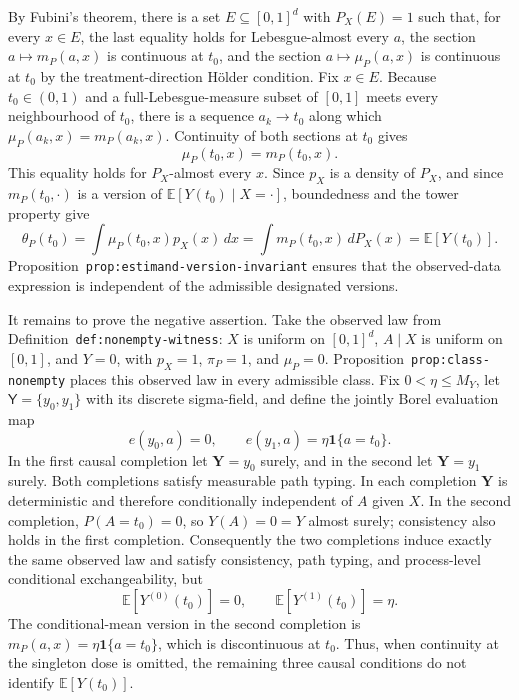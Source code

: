 By Fubini's theorem, there is a set \(E\subseteq[0,1]^d\) with \(P_X(E)=1\) such that, for every \(x\in E\), the last equality holds for Lebesgue-almost every \(a\), the section \(a\mapsto m_P(a,x)\) is continuous at \(t_0\), and the section \(a\mapsto\mu_P(a,x)\) is continuous at \(t_0\) by the treatment-direction H\"older condition. Fix \(x\in E\). Because \(t_0\in(0,1)\) and a full-Lebesgue-measure subset of \([0,1]\) meets every neighbourhood of \(t_0\), there is a sequence \(a_k\to t_0\) along which \(\mu_P(a_k,x)=m_P(a_k,x)\). Continuity of both sections at \(t_0\) gives
\[
\mu_P(t_0,x)=m_P(t_0,x).
\]
This equality holds for \(P_X\)-almost every \(x\). Since \(p_X\) is a density of \(P_X\), and since \(m_P(t_0,\cdot)\) is a version of \(\mathbb E[Y(t_0)\mid X=\cdot]\), boundedness and the tower property give
\[
\theta_P(t_0)
=
\int\mu_P(t_0,x)p_X(x)\,dx
=
\int m_P(t_0,x)\,dP_X(x)
=
\mathbb E[Y(t_0)].
\]
Proposition~\texttt{prop:estimand-version-invariant} ensures that the observed-data expression is independent of the admissible designated versions.

It remains to prove the negative assertion. Take the observed law from Definition~\texttt{def:nonempty-witness}: \(X\) is uniform on \([0,1]^d\), \(A\mid X\) is uniform on \([0,1]\), and \(Y=0\), with \(p_X=1\), \(\pi_P=1\), and \(\mu_P=0\). Proposition~\texttt{prop:class-nonempty} places this observed law in every admissible class. Fix \(0<\eta\le M_Y\), let \(\mathsf Y=\{y_0,y_1\}\) with its discrete sigma-field, and define the jointly Borel evaluation map
\[
e(y_0,a)=0,
\qquad
e(y_1,a)=\eta\mathbf 1\{a=t_0\}.
\]
In the first causal completion let \(\mathbf Y=y_0\) surely, and in the second let \(\mathbf Y=y_1\) surely. Both completions satisfy measurable path typing. In each completion \(\mathbf Y\) is deterministic and therefore conditionally independent of \(A\) given \(X\). In the second completion, \(P(A=t_0)=0\), so \(Y(A)=0=Y\) almost surely; consistency also holds in the first completion. Consequently the two completions induce exactly the same observed law and satisfy consistency, path typing, and process-level conditional exchangeability, but
\[
\mathbb E[Y^{(0)}(t_0)]=0,
\qquad
\mathbb E[Y^{(1)}(t_0)]=\eta.
\]
The conditional-mean version in the second completion is \(m_P(a,x)=\eta\mathbf 1\{a=t_0\}\), which is discontinuous at \(t_0\). Thus, when continuity at the singleton dose is omitted, the remaining three causal conditions do not identify \(\mathbb E[Y(t_0)]\).